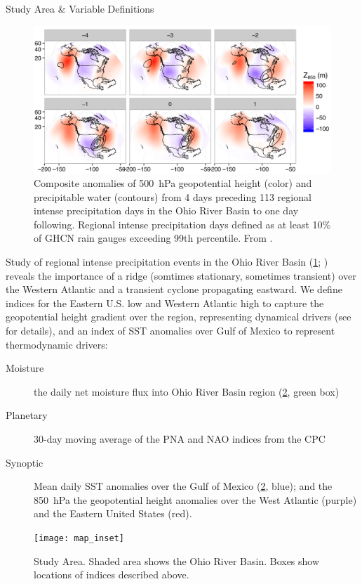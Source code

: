 \begin{block}{Study Area \& Variable Definitions}
    \begin{figure}
        \centering
        \includegraphics[width=0.95\columnwidth]{../FigExternal/djf_composites}
        \caption{Composite anomalies of \SI{500}{\hecto\pascal} geopotential height (color) and precipitable water (contours) from 4 days preceding 113 regional intense precipitation days in the Ohio River Basin to one day following. Regional intense precipitation days defined as at least 10\% of GHCN rain gauges exceeding 99th percentile. From \cite{Farnham2016}.}
        \label{fig:djf-composites}
    \end{figure}
    Study of regional intense precipitation events in the Ohio River Basin (\cref{fig:djf-composites}; \cite{Farnham2016}) reveals the importance of a ridge (somtimes stationary, sometimes transient) over the Western Atlantic and a transient cyclone propagating eastward.
    We define indices for the Eastern U.S. low and Western Atlantic high to capture the geopotential height gradient over the region, representing dynamical drivers (see \cite{Farnham2016,Nakamura2012} for details), and an index of SST anomalies over Gulf of Mexico \cite[see][and references therein]{Steinschneider2016a} to represent thermodynamic drivers:
    \begin{description}
        \item[Moisture] the daily net moisture flux into Ohio River Basin region (\cref{fig:study-area}, green box)
        \item[Planetary] 30-day moving average of the PNA and NAO indices from the CPC
        \item[Synoptic] Mean daily SST anomalies over the Gulf of Mexico (\cref{fig:study-area}, blue); and the \SI{850}{\hecto\pascal} the geopotential height anomalies over the West Atlantic (purple) and the Eastern United States (red).
    \end{description}
    \begin{figure}
        \centering
        \texttt{[image: map\_inset]}
        \caption{Study Area. Shaded area shows the Ohio River Basin. Boxes show locations of indices described above.}
        \label{fig:study-area}
    \end{figure}
\end{block}
